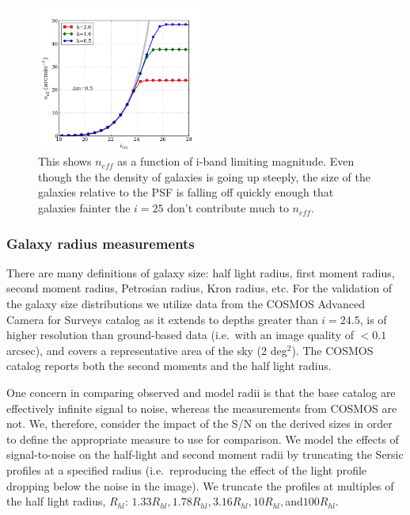 \documentclass[]{article}
\begin{document}
\begin{figure}[th]
\centering
\includegraphics[width=0.5\textwidth]{validation_figures/neff_m_ir.png}
\caption{This shows $n_{eff}$ as a function of i-band limiting magnitude.  Even though the the density of galaxies is going up steeply, the 
size of the galaxies relative to the PSF is falling off quickly enough that galaxies fainter the $i=25$ don't contribute much to $n_{eff}$.\label{fig:neffvm}}
\end{figure}


\subsubsection{Galaxy radius measurements}
There are many definitions of galaxy size: half light radius, first
moment radius, second moment radius, Petrosian radius, Kron radius,
etc.  For the validation of the galaxy size distributions we utilize
data from the COSMOS Advanced Camera for Surveys catalog \citep{cosmos} as it
extends to depths greater than $i=24.5$, is of higher resolution than
ground-based data (i.e.\ with an image quality of $<0.1$ arcsec), and
covers a representative area of the sky (2 deg$^2$). The COSMOS catalog reports both the second moments and the 
half light radius. 

One concern in comparing observed and model radii is that the base
catalog are effectively infinite signal to noise, whereas the
measurements from COSMOS are not.  We, therefore, consider the impact
of the S/N on the derived sizes in order to define the appropriate
measure to use for comparison. We model the effects of signal-to-noise
on the half-light and second moment radii by truncating the Sersic
profiles at a specified radius (i.e.\ reproducing the effect of the
light profile dropping below the noise in the image).  We truncate the
profiles at multiples of the half light radius, $R_{hl}$: $1.33R_{hl},
1.78R_{hl}, 3.16R_{hl}, 10R_{hl}, $and$100R_{hl}$. 
\end{document}
